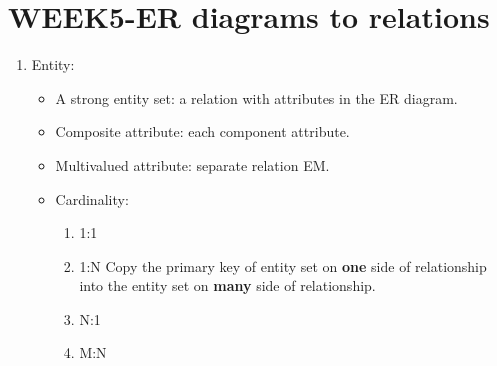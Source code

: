 \pagebreak
\section{WEEK5-ER diagrams to relations}
\begin{enumerate}
    \item Entity:\\ \begin{itemize}
        \item  A strong entity set:  a relation with  attributes in the ER diagram.
        \item Composite attribute: each component attribute.
        \item Multivalued attribute: separate relation EM.
        \item Cardinality: \begin{enumerate}
            \item 1:1
            \item 1:N Copy the primary key of entity set on \textbf{one} side of
relationship into the entity set on \textbf{many} side of
relationship.
            \item N:1
            \item M:N
        \end{enumerate}

    \end{itemize} 
\end{enumerate}
